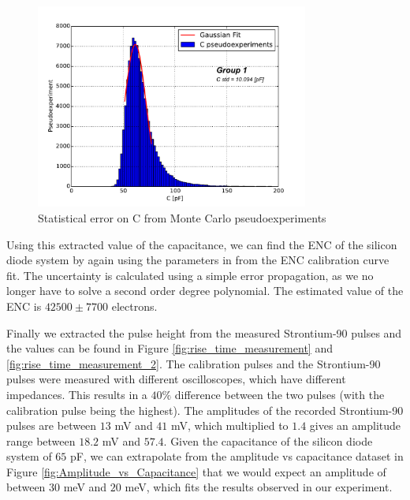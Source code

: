 \documentclass[12pt]{article}
\begin{document}
\begin{figure}[h!]
  \centering
  \includegraphics[width=0.8\textwidth]{./graphics/stat_error_on_C_pseudoexperiments}
  \caption{Statistical error on C from Monte Carlo pseudoexperiments}
  \label{fig:stat_error_on_C}
\end{figure}

Using this extracted value of the capacitance, we can find the ENC of the silicon diode system by again using the parameters in from the ENC calibration curve fit. The uncertainty is calculated using a simple error propagation, as we no longer have to solve a second order degree polynomial. The estimated value of the ENC is $42500 \pm 7700$ electrons.

Finally we extracted the pulse height from the measured Strontium-90 pulses and the values can be found in Figure \ref{fig:rise_time_measurement} and \ref{fig:rise_time_measurement_2}. The calibration pulses and the Strontium-90 pulses were measured with different oscilloscopes, which have different impedances. This results in a $40\%$ difference between the two pulses (with the calibration pulse being the highest). The amplitudes of the recorded Strontium-90 pulses are between $13$ mV and $41$ mV, which multiplied to $1.4$ gives an amplitude range between $18.2$ mV and $57.4$. Given the capacitance of the silicon diode system of $65$ pF, we can extrapolate from the amplitude vs capacitance dataset in Figure \ref{fig:Amplitude_vs_Capacitance} that we would expect an amplitude of between $30$ meV and $20$ meV, which fits the results observed in our experiment.


%
%
\end{document}

